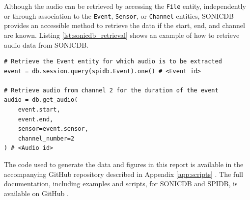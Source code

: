 \documentclass[../Vibro-Acoustic Signatures and Detection Algorithms for Stored Product Insects.tex]{subfiles}
\begin{document}
Although the audio can be retrieved by accessing the \texttt{File} entity, independently or through association to the \texttt{Event}, \texttt{Sensor}, or \texttt{Channel} entities, SONICDB provides an accessible method to retrieve the data if the start, end, and channel are known. Listing \ref{lst:sonicdb_retrieval} shows an example of how to retrieve audio data from SONICDB.

\begin{listing}[htbp]
	\caption{Example of retrieving audio data from SONICDB \label{lst:sonicdb_retrieval}}
	\begin{verbatim}
# Retrieve the Event entity for which audio is to be extracted
event = db.session.query(spidb.Event).one() # <Event id>

# Retrieve audio from channel 2 for the duration of the event
audio = db.get_audio(
    event.start,
    event.end,
    sensor=event.sensor,
    channel_number=2
) # <Audio id>
	\end{verbatim}
\end{listing}

The code used to generate the data and figures in this report is available in the accompanying GitHub repository described in Appendix \ref{app:scripts} \cite{danielkadyrovDkadyrovVibroAcousticSignaturesandDetectionAlgorithmsforStoredProductInsectsDOI2026}. The full documentation, including examples and scripts, for SONICDB and SPIDB, is available on GitHub \cite{danielkadyrovDkadyrovSonicdbV0122025,danielkadyrovDkadyrovSpidbSPIDB2024, danielkadyrovDkadyrovSPIDAcousticV100a2026}.

\newpage
\end{document}
